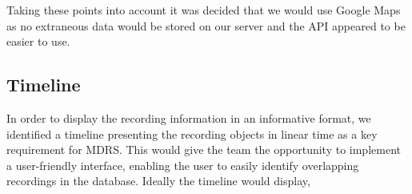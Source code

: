 \documentclass{l3proj}
\begin{document}
Taking these points into account it was decided that we would use Google Maps as no extraneous data would be stored on our server and the API appeared to be easier to use.

\subsection{Timeline}





In order to display the recording information in an informative format, we identified a timeline presenting the recording objects in linear time as a key requirement for MDRS. This would give the team the opportunity to implement a user-friendly interface, enabling the user to easily identify overlapping recordings in the database. Ideally the timeline would display,
\end{document}
